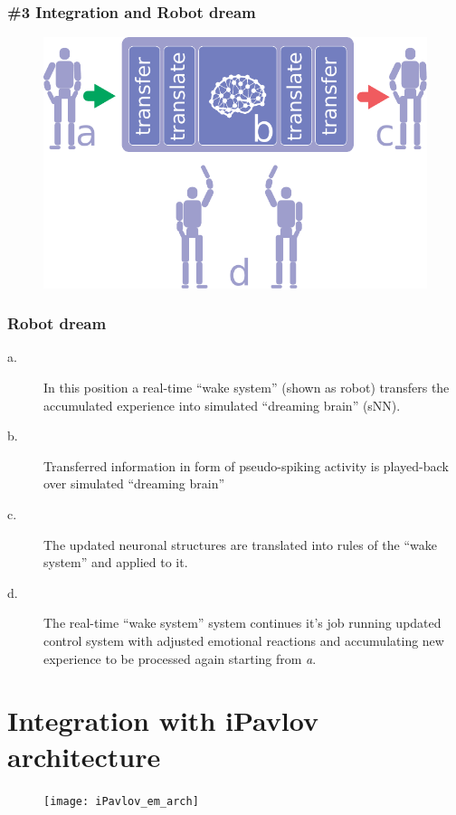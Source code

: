 \documentclass[12pt, aspectratio=169]{beamer}
\begin{document}
\begin{frame}
\frametitle{\#3 Integration and Robot dream}
\begin{figure}
\includegraphics[width=0.8\linewidth]{robot-dream}
\end{figure}
\end{frame}


\begin{frame}
\frametitle{Robot dream}
\begin{description}
  \item[a.] In this position a real-time ``wake system'' (shown as robot) transfers the accumulated experience into simulated ``dreaming brain'' (sNN).
  \item[b.] Transferred information in form of pseudo-spiking activity is played-back over simulated ``dreaming brain''
  \item[c.] The updated neuronal structures are translated into rules  of the ``wake system'' and applied to it.
  \item[d.] The real-time ``wake system'' system continues it's job running updated control system with adjusted emotional reactions and accumulating new experience to be processed again starting from \emph{a}.
  \end{description}
\end{frame}

\section{Integration with iPavlov architecture}

\begin{frame}
\begin{figure}
\texttt{[image: iPavlov\_em\_arch]}
\end{figure}
\end{frame}
\end{document}
